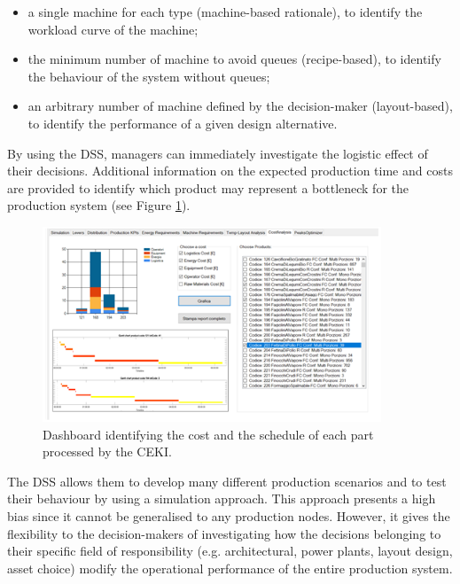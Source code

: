 \begin{itemize}
    \item a single machine for each type (machine-based rationale), to identify the workload curve of the machine;
    \item the minimum number of machine to avoid queues (recipe-based), to identify the behaviour of the system without queues;
    \item an arbitrary number of machine defined by the decision-maker (layout-based), to identify the performance of a given design alternative.

\end{itemize}

By using the DSS, managers can immediately investigate the logistic effect of their decisions. Additional information on the expected production time and costs are provided to identify which product may represent a bottleneck for the production system (see Figure \ref{fig_prod_CAMST_cost}).

\begin{figure}[hbt!]
\centering
\includegraphics[width=0.9\textwidth]{sectionProduction/design_plant_figures/fig_prod_CAMST_cost.png}
\captionsetup{type=figure}
\caption{Dashboard identifying the cost and the schedule of each part processed by the CEKI.}
\label{fig_prod_CAMST_cost}
\end{figure}

The DSS allows them to develop many different production scenarios and to test their behaviour by using a simulation approach. This approach presents a high bias since it cannot be generalised to any production nodes. However, it gives the flexibility to the decision-makers of investigating how the decisions belonging to their specific field of responsibility (e.g. architectural, power plants, layout design, asset choice) modify the operational performance of the entire production system.

